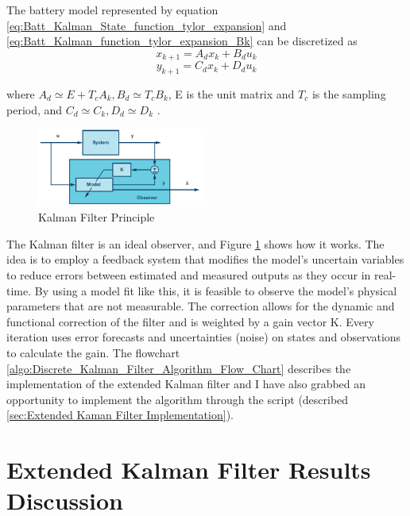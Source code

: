 The battery model represented by equation \ref{eq:Batt_Kalman_State_function_tylor_expansion} and \ref{eq:Batt_Kalman_function_tylor_expansion_Bk} can be discretized as
\begin{equation}\label{eq:Batt_Kalman_State_Prediction}
    x_{k+1} = A_d x_k + B_d u_k 
\end{equation}
\begin{equation}\label{eq:Batt_Kalman_Output_Prediction}
    y_{k+1} = C_d x_k + D_d u_k
\end{equation}

where $A_d \simeq  E + T_c A_k, B_d \simeq  T_c B_k$, E is the unit matrix and $T_c$ is the sampling 
period, and $C_d \simeq  C_k, D_d \simeq  D_k$ . 
\begin{figure}
    \centering
    \includegraphics[width=0.5\textwidth]{Chap07/Figures/Kalman_principle.PNG}
    \caption{Kalman Filter Principle}
    \label{fig:Kalman_Filter_Principle}
\end{figure}
The Kalman filter is an ideal observer, and Figure \ref{fig:Kalman_Filter_Principle} shows how it works. The idea is to employ a feedback system that modifies the model's uncertain variables to reduce errors between estimated and measured outputs as they occur in real-time. By using a model fit like this, it is feasible to observe the model's physical parameters that are not measurable. The correction allows for the dynamic and functional correction of the filter and is weighted by a gain vector K. Every iteration uses error forecasts and uncertainties (noise) on states and observations to calculate the gain.
The flowchart \ref {algo:Discrete_Kalman_Filter_Algorithm_Flow_Chart} describes the implementation of the extended Kalman filter and I have also grabbed an opportunity to implement the algorithm through the script (described \ref{sec:Extended Kaman Filter Implementation}). 

\section{Extended Kalman Filter Results Discussion}

